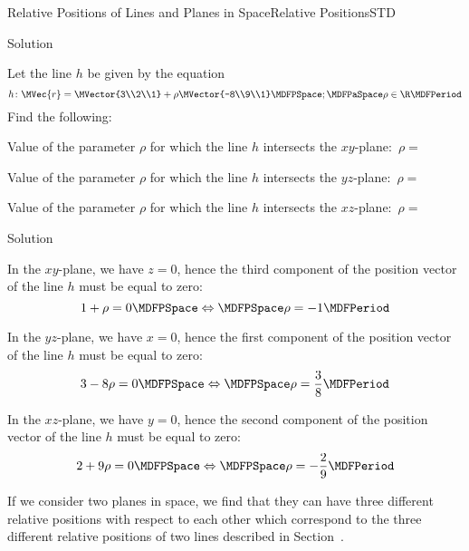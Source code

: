 \begin{MXContent}{Relative Positions of Lines and Planes in Space}{Relative Positions}{STD}
\begin{MExercise}
\begin{MHint}{Solution}
\end{MHint}


\end{MExercise}

\begin{MExercise}
Let the line $h$ be given by the equation 
\[
 h\colon\MVec{r}=\MVector{3\\2\\1}+\rho\MVector{-8\\9\\1}\MDFPSpace;\MDFPaSpace\rho\in\R\MDFPeriod
\]
Find the following:
\begin{MExerciseItems}
\item{Value of the parameter $\rho$ for which the line $h$ intersects the $x y$-plane:\ $\rho=$}
\item{Value of the parameter $\rho$ for which the line $h$ intersects the $y z$-plane:\ $\rho=$}
\item{Value of the parameter $\rho$ for which the line $h$ intersects the $x z$-plane:\ $\rho=$}
\end{MExerciseItems}

\begin{MHint}{Solution}
\begin{MExerciseItems}
\item{In the $x y$-plane, we have $z=0$, hence the third component of the position vector of the line $h$ must be equal to zero:
\[
 1+\rho=0\MDFPSpace\Leftrightarrow\MDFPSpace\rho=-1\MDFPeriod
\]
} 
\item{In the $y z$-plane, we have $x=0$, hence the first component of the position vector of the line $h$ must be equal to zero:
\[
 3-8\rho=0\MDFPSpace\Leftrightarrow\MDFPSpace\rho=\frac{3}{8}\MDFPeriod
\]
} 
\item{In the $x z$-plane, we have $y=0$, hence the second component of the position vector of the line $h$ must be equal to zero:
\[
 2+9\rho=0\MDFPSpace\Leftrightarrow\MDFPSpace\rho=-\frac{2}{9}\MDFPeriod
\]
} 
\end{MExerciseItems}
 
\end{MHint}

\end{MExercise}

If we consider two planes in space, we find that they can have three different relative positions with 
respect to each other which correspond to the three different relative positions of two lines described in
Section~.


\end{MXContent}
